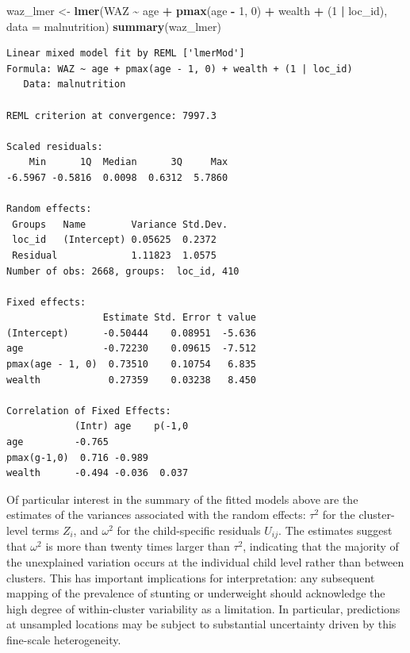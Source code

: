 \documentclass[
  letterpaper,
]{krantz}
\newenvironment{Shaded}{\begin{snugshade}}{\end{snugshade}}
\newcommand{\AttributeTok}[1]{\textcolor[rgb]{0.13,0.29,0.53}{#1}}
\newcommand{\DecValTok}[1]{\textcolor[rgb]{0.00,0.00,0.81}{#1}}
\newcommand{\FunctionTok}[1]{\textcolor[rgb]{0.13,0.29,0.53}{\textbf{#1}}}
\newcommand{\NormalTok}[1]{#1}
\newcommand{\OtherTok}[1]{\textcolor[rgb]{0.56,0.35,0.01}{#1}}
\newcommand{\SpecialCharTok}[1]{\textcolor[rgb]{0.81,0.36,0.00}{\textbf{#1}}}
\begin{document}
\begin{Shaded}
\begin{Highlighting}[]
\NormalTok{waz\_lmer }\OtherTok{\textless{}{-}} 
  \FunctionTok{lmer}\NormalTok{(WAZ }\SpecialCharTok{\textasciitilde{}}\NormalTok{ age }\SpecialCharTok{+} \FunctionTok{pmax}\NormalTok{(age }\SpecialCharTok{{-}} \DecValTok{1}\NormalTok{, }\DecValTok{0}\NormalTok{) }\SpecialCharTok{+}\NormalTok{ wealth }\SpecialCharTok{+}\NormalTok{ (}\DecValTok{1} \SpecialCharTok{|}\NormalTok{ loc\_id), }\AttributeTok{data =}\NormalTok{ malnutrition)}
\FunctionTok{summary}\NormalTok{(waz\_lmer)}
\end{Highlighting}
\end{Shaded}

\begin{verbatim}
Linear mixed model fit by REML ['lmerMod']
Formula: WAZ ~ age + pmax(age - 1, 0) + wealth + (1 | loc_id)
   Data: malnutrition

REML criterion at convergence: 7997.3

Scaled residuals: 
    Min      1Q  Median      3Q     Max 
-6.5967 -0.5816  0.0098  0.6312  5.7860 

Random effects:
 Groups   Name        Variance Std.Dev.
 loc_id   (Intercept) 0.05625  0.2372  
 Residual             1.11823  1.0575  
Number of obs: 2668, groups:  loc_id, 410

Fixed effects:
                 Estimate Std. Error t value
(Intercept)      -0.50444    0.08951  -5.636
age              -0.72230    0.09615  -7.512
pmax(age - 1, 0)  0.73510    0.10754   6.835
wealth            0.27359    0.03238   8.450

Correlation of Fixed Effects:
            (Intr) age    p(-1,0
age         -0.765              
pmax(g-1,0)  0.716 -0.989       
wealth      -0.494 -0.036  0.037
\end{verbatim}

Of particular interest in the summary of the fitted models above are the
estimates of the variances associated with the random effects:
\(\tau^2\) for the cluster-level terms \(Z_i\), and \(\omega^2\) for the
child-specific residuals \(U_{ij}\). The estimates suggest that
\(\omega^2\) is more than twenty times larger than \(\tau^2\),
indicating that the majority of the unexplained variation occurs at the
individual child level rather than between clusters. This has important
implications for interpretation: any subsequent mapping of the
prevalence of stunting or underweight should acknowledge the high degree
of within-cluster variability as a limitation. In particular,
predictions at unsampled locations may be subject to substantial
uncertainty driven by this fine-scale heterogeneity.
\end{document}
